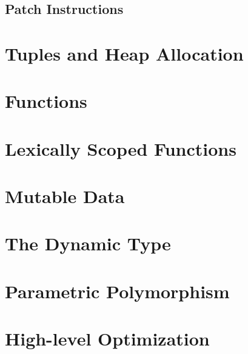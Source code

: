 \documentclass[12pt]{book}
\begin{document}
\section{Patch Instructions}


\chapter{Tuples and Heap Allocation}
\label{ch:tuples}

\chapter{Functions}
\label{ch:functions}


\chapter{Lexically Scoped Functions}
\label{ch:lambdas}


\chapter{Mutable Data}
\label{ch:mutable-data}

\chapter{The Dynamic Type}
\label{ch:type-dynamic}


\chapter{Parametric Polymorphism}
\label{ch:parametric-polymorphism}

\chapter{High-level Optimization}
\label{ch:high-level-optimization}




\end{document}
